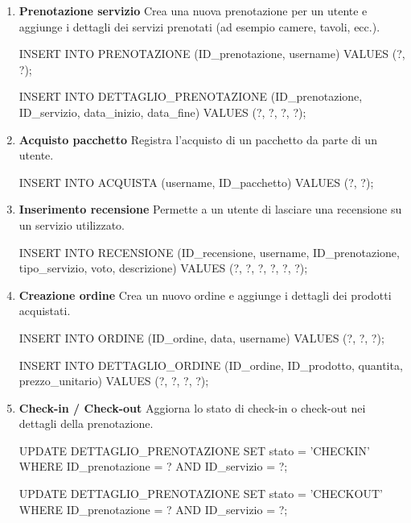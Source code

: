 \documentclass[a4paper,12pt]{report}
\begin{document}
\begin{enumerate}[label=\textbf{\arabic*.}]
	\item \textbf{Prenotazione servizio} \newline
	      Crea una nuova prenotazione per un utente e aggiunge i dettagli dei servizi prenotati (ad esempio camere, tavoli, ecc.).
\begin{sqlcode}
INSERT INTO PRENOTAZIONE (ID_prenotazione, username)
VALUES (?, ?);

INSERT INTO DETTAGLIO_PRENOTAZIONE (ID_prenotazione, ID_servizio, data_inizio, data_fine)
VALUES (?, ?, ?, ?);
\end{sqlcode}

	\item \textbf{Acquisto pacchetto} \newline
	      Registra l’acquisto di un pacchetto da parte di un utente.
\begin{sqlcode}
INSERT INTO ACQUISTA (username, ID_pacchetto)
VALUES (?, ?);
\end{sqlcode}

	\item \textbf{Inserimento recensione} \newline
	      Permette a un utente di lasciare una recensione su un servizio utilizzato.
\begin{sqlcode}
INSERT INTO RECENSIONE (ID_recensione, username, ID_prenotazione, tipo_servizio, voto, descrizione)
VALUES (?, ?, ?, ?, ?, ?);
\end{sqlcode}

	\item \textbf{Creazione ordine} \newline
	      Crea un nuovo ordine e aggiunge i dettagli dei prodotti acquistati.
\begin{sqlcode}
INSERT INTO ORDINE (ID_ordine, data, username)
VALUES (?, ?, ?);

INSERT INTO DETTAGLIO_ORDINE (ID_ordine, ID_prodotto, quantita, prezzo_unitario)
VALUES (?, ?, ?, ?);
\end{sqlcode}

	\item \textbf{Check-in / Check-out} \newline
	      Aggiorna lo stato di check-in o check-out nei dettagli della prenotazione.
\begin{sqlcode}
UPDATE DETTAGLIO_PRENOTAZIONE
SET stato = 'CHECKIN'
WHERE ID_prenotazione = ? AND ID_servizio = ?;

UPDATE DETTAGLIO_PRENOTAZIONE
SET stato = 'CHECKOUT'
WHERE ID_prenotazione = ? AND ID_servizio = ?;
\end{sqlcode}


\end{enumerate}
\end{document}
